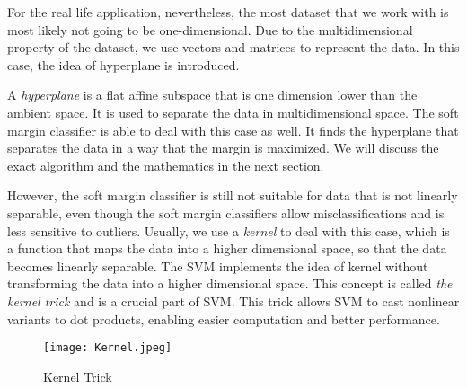 For the real life application, nevertheless, the most dataset that we work with is 
most likely not going to be one-dimensional. Due to the multidimensional property of the dataset,
we use vectors and matrices to represent the data. In this case, the idea of hyperplane is introduced. 

A \emph{hyperplane} is a flat affine subspace that is one dimension lower than the ambient space.\cite{R9}
It is used to separate the data in multidimensional space. The soft margin classifier is able to deal with this case as well.
It finds the hyperplane that separates the data in a way that the margin is maximized. We will discuss the exact algorithm and the
mathematics in the next section.

However, the soft margin classifier is still not suitable for data that is not linearly separable, even though 
the soft margin classifiers allow misclassifications and is less sensitive to outliers. Usually, we use a \emph{kernel} to deal 
with this case, which is a function that maps the data into a higher dimensional space, so that the data becomes linearly
separable. The SVM implements the idea of kernel without transforming the data into a higher dimensional space. This concept is 
called \emph{the kernel trick} and is a crucial part of SVM. This trick allows SVM to cast nonlinear variants to dot products,
enabling easier computation and better performance. \cite{Kernel2}
\begin{figure}[h]%
    \begin{center}%
        \texttt{[image: Kernel.jpeg]}%
        \caption{Kernel Trick \cite{imgintro}}\label{fig:}%
    \end{center}%
\end{figure}
